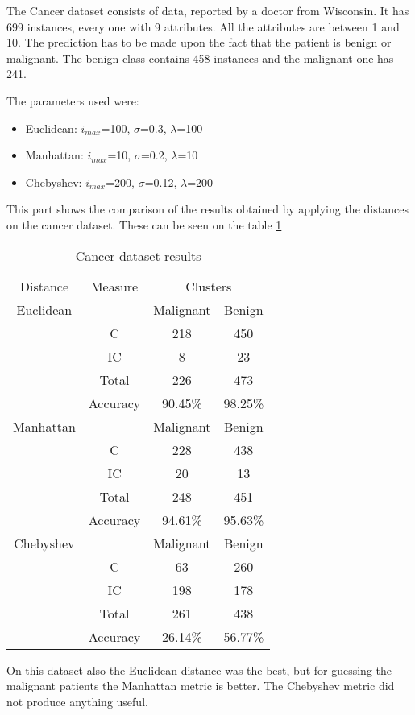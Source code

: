\documentclass[conference]{IEEEtran}
\begin{document}
The Cancer dataset \cite{website:breastcancer} consists of data, reported by a doctor from Wisconsin. It has 699 instances, every one with 9 attributes. All the attributes are between 1 and 10. The prediction has to be made upon the fact that the patient is benign or malignant. The benign class contains 458 instances and the malignant one has 241.

The parameters used were:
\begin{itemize}
\item Euclidean: $i_{max}$=100, $\sigma$=0.3, $\lambda$=100
\item Manhattan: $i_{max}$=10, $\sigma$=0.2, $\lambda$=10
\item Chebyshev: $i_{max}$=200, $\sigma$=0.12, $\lambda$=200
\end{itemize}

This part shows the comparison of the results obtained by applying the distances on the cancer \cite{website:breastcancer} dataset. These can be seen on the table \ref{table_cancer}

\begin{table}[!t]
\renewcommand{\arraystretch}{1.3}
\caption{Cancer dataset results}
\label{table_cancer}
\centering
\begin{tabular}{|c|c|c|c|}
\cline{1-4}
 Distance & Measure & \multicolumn{2}{|c|}{Clusters} \\
\cline{1-4}
Euclidean & & Malignant & Benign	  \\
& C & 218 & 450 \\
& IC & 8 & 23 \\
& Total & 226 & 473 \\
& Accuracy & 90.45\% & 98.25\% \\
\hline
Manhattan & & Malignant & Benign	  \\
& C & 228 & 438 \\
& IC & 20 & 13 \\
\hline
& Total & 248 & 451 \\
& Accuracy & 94.61\% & 95.63\% \\
Chebyshev & & Malignant & Benign	  \\
& C & 63 & 260 \\
& IC & 198 & 178 \\
& Total & 261 & 438 \\
& Accuracy & 26.14\% & 56.77\% \\
\hline
\end{tabular}
\end{table}

On this dataset also the Euclidean distance was the best, but for guessing the malignant patients the Manhattan metric is better. The Chebyshev metric did not produce anything useful.
\end{document}
